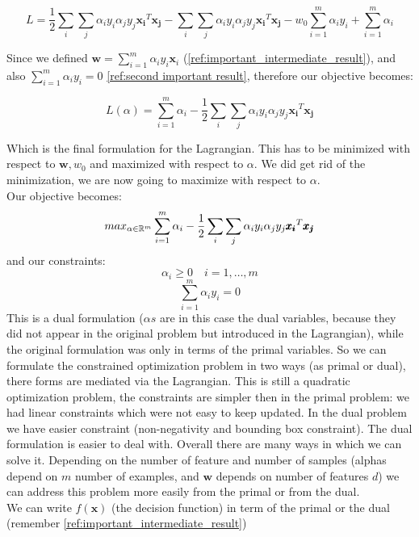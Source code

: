            $$L = \frac{1}{2} \sum_{i} \sum_{j} \alpha_i y_i \alpha_j y_j \pmb{x_i} ^T \pmb{x_j}  - 
                \sum_{i} \sum_{j} \alpha_i y_i \alpha_j y_j \pmb{x_i} ^T \pmb{x_j} - 
                w_0 \sum_{i=1}^m \alpha_i y_i + \sum_{i=1}^m \alpha_i$$

            Since we defined $\pmb{w} =  \sum_{i=1}^m \alpha_i y_i \pmb{x}_i$ (\ref{ref:important_intermediate_result}), and also $\sum_{i=1}^m \alpha_i y_i = 0$ \ref{ref:second important result}, therefore our objective becomes:

            $$L(\alpha) =  \sum_{i=1}^m \alpha_i - 
                \frac{1}{2} \sum_{i} \sum_{j} \alpha_i y_i \alpha_j y_j \pmb{x_i} ^T \pmb{x_j} $$

            Which is the final formulation for the Lagrangian. This has to be minimized with respect to $\pmb{w}, w_0$ and maximized with respect to $\alpha$. We did get rid of the minimization, we are now going to maximize with respect to $\alpha$.\\

            Our objective becomes:
            $$max_{\alpha \in \mathbb{R}^m}\sum_{i=1}^m \alpha_i - 
                \frac{1}{2} \sum_{i} \sum_{j} \alpha_i y_i \alpha_j y_j \pmb{x_i} ^T \pmb{x_j} $$
            and our constraints:
            $$\alpha_i \geq 0 \quad i = 1, \dots, m$$
            $$\sum_{i=1}^m \alpha_i y_i = 0$$
            This is a dual formulation ($\alpha s$ are in this case the dual variables, because they did not appear in the original problem but introduced in the Lagrangian), while the original formulation was only in terms of the primal variables. 
            So we can formulate the constrained optimization problem in two ways (as primal or dual), there forms are mediated via the Lagrangian.
            This is still a quadratic optimization problem, the constraints are simpler then in the primal problem: we had linear constraints which were not easy to keep updated.
            In the dual problem we have easier constraint (non-negativity and bounding box constraint).
            The dual formulation is easier to deal with. Overall there are many ways in which we can solve it.
            Depending on the number of feature and number of samples (alphas depend on $m$ number of examples, and $\pmb{w}$ depends on number of features $d$) we can address this problem more easily from the primal or from the dual. \\

            We can write $f(\pmb{x})$ (the decision function) in term of the primal or the dual (remember \ref{ref:important_intermediate_result})
            
